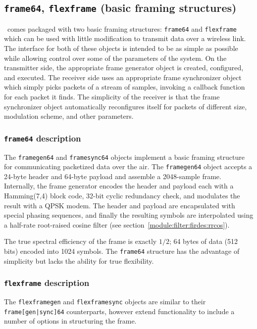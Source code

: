 \subsection{{\tt frame64}, {\tt flexframe} (basic framing structures)}
\label{module:framing:frames}
\liquid\ comes packaged with two basic framing structures: {\tt frame64} and
{\tt flexframe} which can be used with little modification to transmit data
over a wireless link.
The interface for both of these objects is intended to be as simple as
possible while allowing control over some of the parameters of the system.
On the transmitter side, the appropriate frame generator object is created,
configured, and executed.
The receiver side uses an appropriate frame synchronizer object which simply
picks packets of a stream of samples, invoking a callback function for each
packet it finds.
The simplicity of the receiver is that the frame synchronizer object
automatically reconfigures itself for packets of different size, modulation
scheme, and other parameters.

\subsubsection{{\tt frame64} description}
\label{module:framing:frames:frame64}
The {\tt framegen64} and {\tt framesync64} objects implement a basic framing
structure for communicating packetized data over the air.
The {\tt framegen64} object accepts a 24-byte header and 64-byte payload and
assemble a 2048-sample frame.
Internally, the frame generator encodes the header and payload each with a
Hamming(7,4) block code, 32-bit cyclic redundancy check, and modulates the
result with a QPSK modem.
The header and payload are encapsulated with special phasing sequences, and
finally the resulting symbols are interpolated using a half-rate root-raised
cosine filter (see section~\ref{module:filter:firdes:rrcos}).

The true spectral efficiency of the frame is exactly $1/2$; 64 bytes of data
(512 bits) encoded into 1024 symbols.
The {\tt frame64} structure has the advantage of simplicity but lacks the
ability for true flexibility.

\subsubsection{{\tt flexframe} description}
\label{module:framing:frames:flexframe}
The {\tt flexframegen} and {\tt flexframesync} objects are similar to their
{\tt frame[gen|sync]64} counterparts, however extend functionality to include
a number of options in structuring the frame.

